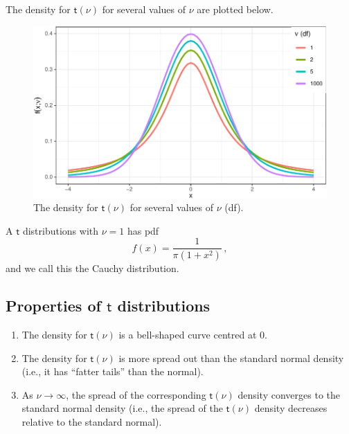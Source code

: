 \documentclass[
  a4paper,
  oneside]{book}
\providecommand{\tightlist}{%
  \setlength{\itemsep}{0pt}\setlength{\parskip}{0pt}}\usepackage{longtable,booktabs,array}
\theoremstyle{definition}
\theoremstyle{definition}
\theoremstyle{definition}
\theoremstyle{plain}
\theoremstyle{remark}
\begin{document}
The density for \(\mathsf{t}(\nu)\) for several values of \(\nu\) are
plotted below.

\begin{figure}[H]

{\centering \includegraphics{01-sampling-distributions_files/figure-pdf/exemplar-t-dist-1.pdf}

}

\caption{The density for \(\mathsf{t}(\nu)\) for several values of
\(\nu\) (df).}

\end{figure}%

\begin{tipblock}
A \(\mathsf{t}\) distributions with \(\nu = 1\) has pdf
\[f(x) = \frac{1}{\pi (1 + x^2)}\,,\] and we call this the Cauchy
distribution.

\end{tipblock}

\subsection{\texorpdfstring{Properties of \(\mathsf{t}\)
distributions}{Properties of \textbackslash mathsf\{t\} distributions}}\label{facts-t}

\begin{enumerate}
\def\labelenumi{\arabic{enumi}.}
\tightlist
\item
  The density for \(\mathsf{t}(\nu)\) is a bell-shaped curve centred at
  \(0\).
\item
  The density for \(\mathsf{t}(\nu)\) is more spread out than the
  standard normal density (i.e., it has ``fatter tails'' than the
  normal).
\item
  As \(\nu \to \infty\), the spread of the corresponding
  \(\mathsf{t}(\nu)\) density converges to the standard normal density
  (i.e., the spread of the \(\mathsf{t}(\nu)\) density decreases
  relative to the standard normal).
\end{enumerate}
\end{document}
